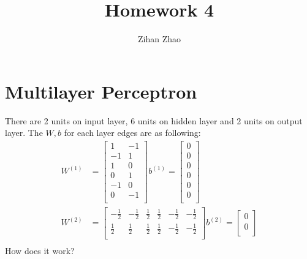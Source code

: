\documentclass{article}
\author{Zihan Zhao}
\affil{1001103708}
\title{Homework 4}
\date{}
\begin{document}
\maketitle
\renewcommand{\thesubsection}{(\alph{subsection})}
\section{Multilayer Perceptron}
There are 2 units on input layer, 6 units on hidden layer and 2 units on output layer. The $W,b$ for each layer edges are as following:
\begin{align*}
    W^{(1)} &= 
    \begin{bmatrix}
        1 & -1\\
        -1 & 1\\
        1 & 0\\
        0 & 1\\
        -1 & 0\\
        0 & -1\\
    \end{bmatrix}
    b^{(1)} = 
    \begin{bmatrix}
        0\\
        0\\
        0\\
        0\\
        0\\
        0\\
    \end{bmatrix}\\
    W^{(2)} &= 
    \begin{bmatrix}
        -\frac{1}{2} & -\frac{1}{2} & \frac{1}{2} & \frac{1}{2} & -\frac{1}{2} & -\frac{1}{2}\\
        \frac{1}{2} & \frac{1}{2} & \frac{1}{2} & \frac{1}{2} & -\frac{1}{2} & -\frac{1}{2}\\
    \end{bmatrix}
    b^{(2)} = 
    \begin{bmatrix}
        0\\
        0\\
    \end{bmatrix}\\
\end{align*}
How does it work?\\
\end{document}
